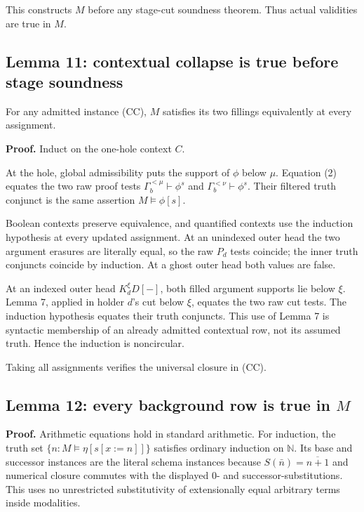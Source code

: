 \documentclass[
  11pt,
  letterpaper,
]{article}
\begin{document}
This constructs \(M\) before any stage-cut soundness theorem. Thus
actual validities are true in \(M\).

\subsection{Lemma 11: contextual collapse is true before stage
soundness}\label{lemma-11-contextual-collapse-is-true-before-stage-soundness}

For any admitted instance (CC), \(M\) satisfies its two fillings
equivalently at every assignment.

\textbf{Proof.} Induct on the one-hole context \(C\).

At the hole, global admissibility puts the support of \(\phi\) below
\(\mu\). Equation (2) equates the two raw proof tests
\(\Gamma_b^{<\mu}\vdash\phi^s\) and \(\Gamma_b^{<\nu}\vdash\phi^s\).
Their filtered truth conjunct is the same assertion \(M\models\phi[s]\).

Boolean contexts preserve equivalence, and quantified contexts use the
induction hypothesis at every updated assignment. At an unindexed outer
head the two argument erasures are literally equal, so the raw \(P_d\)
tests coincide; the inner truth conjuncts coincide by induction. At a
ghost outer head both values are false.

At an indexed outer head \(K_d^\xi D[-]\), both filled argument supports
lie below \(\xi\). Lemma 7, applied in holder \(d\)'s cut below \(\xi\),
equates the two raw cut tests. The induction hypothesis equates their
truth conjuncts. This use of Lemma 7 is syntactic membership of an
already admitted contextual row, not its assumed truth. Hence the
induction is noncircular.

Taking all assignments verifies the universal closure in (CC).

\subsection{\texorpdfstring{Lemma 12: every background row is true in
\(M\)}{Lemma 12: every background row is true in M}}\label{lemma-12-every-background-row-is-true-in-m}

\textbf{Proof.} Arithmetic equations hold in standard arithmetic. For
induction, the truth set \(\{n:M\models\eta[s[x:=n]]\}\) satisfies
ordinary induction on \(\mathbb N\). Its base and successor instances
are the literal schema instances because \(S(\bar n)=\overline{n+1}\)
and numerical closure commutes with the displayed \(0\)- and
successor-substitutions. This uses no unrestricted substitutivity of
extensionally equal arbitrary terms inside modalities.
\end{document}
